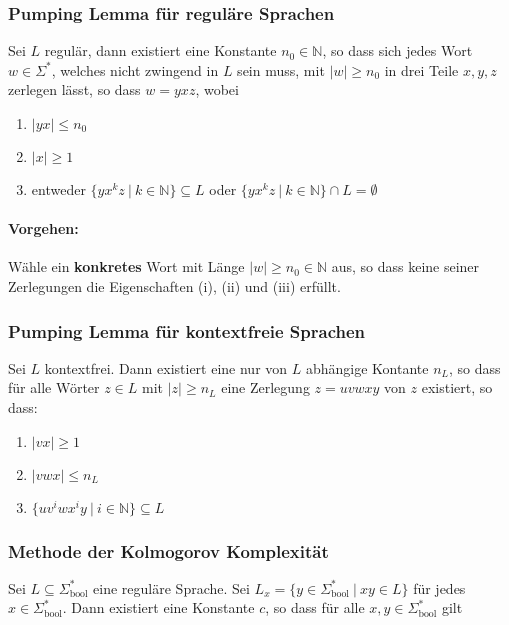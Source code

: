 \documentclass[11pt]{article}
\begin{document}
\subsubsection{Pumping Lemma f{\"u}r regul{\"a}re Sprachen}

Sei $L$ regul{\"a}r, dann existiert eine Konstante $n_0 \in \mathbb{N}$, so dass sich jedes Wort $w \in \Sigma^*$, welches nicht zwingend in $L$ sein muss, mit $|w| \geq n_0$ in drei Teile $x, y, z$ zerlegen l{\"a}sst, so dass $w = yxz$, wobei

\begin{enumerate}[label=(\roman*), noitemsep]
	\item $|yx| \leq n_0$
	\item $|x| \geq 1$
	\item entweder $\{yx^kz\ |\ k \in \mathbb{N}\} \subseteq L$ oder $\{yx^kz\ |\ k \in \mathbb{N}\} \cap L = \emptyset$
\end{enumerate}

\paragraph{Vorgehen:} W{\"a}hle ein \textbf{konkretes} Wort mit L{\"a}nge $|w| \geq n_0 \in \mathbb{N}$ aus, so dass keine seiner Zerlegungen die Eigenschaften (i), (ii) und (iii) erf{\"u}llt.

\subsubsection{Pumping Lemma f{\"u}r kontextfreie Sprachen}

Sei $L$ kontextfrei. Dann existiert eine nur von $L$ abh{\"a}ngige Kontante $n_L$, so dass f{\"u}r alle Wörter $z \in L$ mit $|z| \geq n_L$ eine Zerlegung $z = uvwxy$ von $z$ existiert, so dass:
\begin{enumerate}[label=(\roman*), noitemsep]
	\item $|vx| \geq 1$
	\item $|vwx| \leq n_L$
	\item $\{uv^iwx^iy\ |\ i \in \mathbb{N}\} \subseteq L$
\end{enumerate}

\subsubsection{Methode der Kolmogorov Komplexit{\"a}t}

Sei $L \subseteq \Sigma_\text{bool}^*$ eine regul{\"a}re Sprache. Sei $L_x = \{y \in \Sigma_\text{bool}^*\ |\ xy \in L\}$ f{\"u}r jedes $x \in \Sigma_\text{bool}^*$. Dann existiert eine Konstante $c$, so dass f{\"u}r alle $x,y \in \Sigma_\text{bool}^*$ gilt
\end{document}
